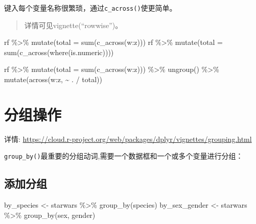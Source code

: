 \documentclass[
]{book}
\newenvironment{Shaded}{\begin{snugshade}}{\end{snugshade}}
\newcommand{\AttributeTok}[1]{\textcolor[rgb]{0.77,0.63,0.00}{#1}}
\newcommand{\FunctionTok}[1]{\textcolor[rgb]{0.00,0.00,0.00}{#1}}
\newcommand{\NormalTok}[1]{#1}
\newcommand{\OtherTok}[1]{\textcolor[rgb]{0.56,0.35,0.01}{#1}}
\newcommand{\SpecialCharTok}[1]{\textcolor[rgb]{0.00,0.00,0.00}{#1}}
\begin{document}
键入每个变量名称很繁琐，通过\texttt{c\_across()}使更简单。

\begin{quote}
详情可见vignette(``rowwise'')。
\end{quote}

\begin{Shaded}
\begin{Highlighting}[]
\NormalTok{rf }\SpecialCharTok{\%\textgreater{}\%} \FunctionTok{mutate}\NormalTok{(}\AttributeTok{total =} \FunctionTok{sum}\NormalTok{(}\FunctionTok{c\_across}\NormalTok{(w}\SpecialCharTok{:}\NormalTok{z)))}
\NormalTok{rf }\SpecialCharTok{\%\textgreater{}\%} \FunctionTok{mutate}\NormalTok{(}\AttributeTok{total =} \FunctionTok{sum}\NormalTok{(}\FunctionTok{c\_across}\NormalTok{(}\FunctionTok{where}\NormalTok{(is.numeric))))}

\NormalTok{rf }\SpecialCharTok{\%\textgreater{}\%} 
  \FunctionTok{mutate}\NormalTok{(}\AttributeTok{total =} \FunctionTok{sum}\NormalTok{(}\FunctionTok{c\_across}\NormalTok{(w}\SpecialCharTok{:}\NormalTok{z))) }\SpecialCharTok{\%\textgreater{}\%} 
  \FunctionTok{ungroup}\NormalTok{() }\SpecialCharTok{\%\textgreater{}\%} 
  \FunctionTok{mutate}\NormalTok{(}\FunctionTok{across}\NormalTok{(w}\SpecialCharTok{:}\NormalTok{z, }\SpecialCharTok{\textasciitilde{}}\NormalTok{ . }\SpecialCharTok{/}\NormalTok{ total))}
\end{Highlighting}
\end{Shaded}

\hypertarget{dplyr-groupby-manipulation}{%
\section{分组操作}\label{dplyr-groupby-manipulation}}

详情: \url{https://cloud.r-project.org/web/packages/dplyr/vignettes/grouping.html}

\texttt{group\_by()}最重要的分组动词,需要一个数据框和一个或多个变量进行分组：

\hypertarget{ux6dfbux52a0ux5206ux7ec4}{%
\subsection{添加分组}\label{ux6dfbux52a0ux5206ux7ec4}}

\begin{Shaded}
\begin{Highlighting}[]
\NormalTok{by\_species }\OtherTok{\textless{}{-}}\NormalTok{ starwars }\SpecialCharTok{\%\textgreater{}\%} \FunctionTok{group\_by}\NormalTok{(species)}
\NormalTok{by\_sex\_gender }\OtherTok{\textless{}{-}}\NormalTok{ starwars }\SpecialCharTok{\%\textgreater{}\%} \FunctionTok{group\_by}\NormalTok{(sex, gender)}
\end{Highlighting}
\end{Shaded}
\end{document}
